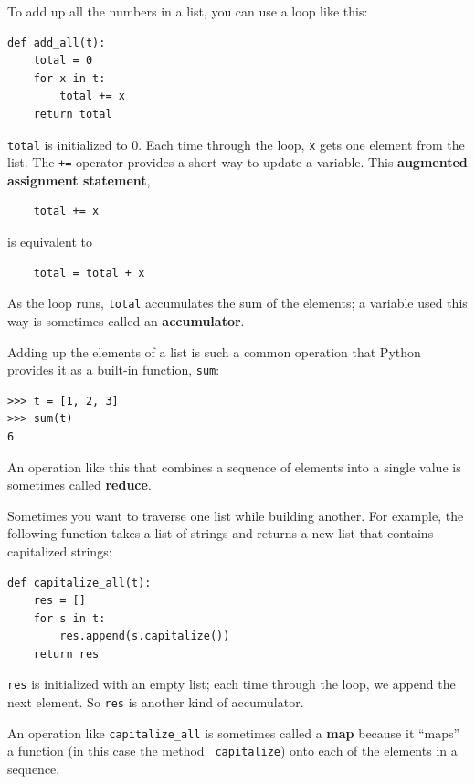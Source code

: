 \documentclass[10pt]{book}
\begin{document}
To add up all the numbers in a list, you can use a loop like this:


\begin{verbatim}
def add_all(t):
    total = 0
    for x in t:
        total += x
    return total
\end{verbatim}
%
{\tt total} is initialized to 0.  Each time through the loop,
{\tt x} gets one element from the list.  The {\tt +=} operator
provides a short way to update a variable.  This 
{\bf augmented assignment statement},

\begin{verbatim}
    total += x
\end{verbatim}
%
is equivalent to

\begin{verbatim}
    total = total + x
\end{verbatim}
%
As the loop runs, {\tt total} accumulates the sum of the
elements; a variable used this way is sometimes called an
{\bf accumulator}.

Adding up the elements of a list is such a common operation
that Python provides it as a built-in function, {\tt sum}:

\begin{verbatim}
>>> t = [1, 2, 3]
>>> sum(t)
6
\end{verbatim}
%
An operation like this that combines a sequence of elements into
a single value is sometimes called {\bf reduce}.

Sometimes you want to traverse one list while building
another.  For example, the following function takes a list of strings
and returns a new list that contains capitalized strings:

\begin{verbatim}
def capitalize_all(t):
    res = []
    for s in t:
        res.append(s.capitalize())
    return res
\end{verbatim}
%
{\tt res} is initialized with an empty list; each time through
the loop, we append the next element.  So {\tt res} is another
kind of accumulator.

An operation like \verb"capitalize_all" is sometimes called a {\bf
map} because it ``maps'' a function (in this case the method {\tt
capitalize}) onto each of the elements in a sequence.
\end{document}
